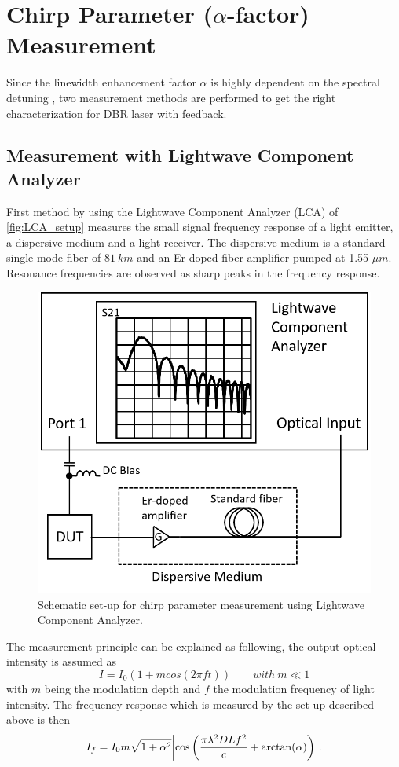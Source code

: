 \section{Chirp Parameter ($\alpha$-factor) Measurement}\label{sec:chirp_measurement}
Since the linewidth enhancement factor $\alpha$ is highly dependent on the spectral detuning \cite{soriano2013complex}, two measurement methods are performed to get the right characterization for DBR laser with feedback.

\subsection{Measurement with Lightwave Component Analyzer}\label{subsec:measurement_with_LCA}
First method by using the Lightwave Component Analyzer (LCA) of \autoref{fig:LCA_setup} measures the small signal frequency response of a light emitter, a dispersive medium and a light receiver. The dispersive medium is a standard single mode fiber of $81 \ km$ and an Er-doped fiber amplifier pumped at 1.55 $\mu m$. Resonance frequencies are observed as sharp peaks in the frequency response.
\begin{figure}[ht]
    \centering
    \includegraphics[width=.5\linewidth]{figures/LCA_setup.png}
    \caption{Schematic set-up for chirp parameter measurement using Lightwave Component Analyzer.}
    \label{fig:LCA_setup}
\end{figure}

The measurement principle can be explained as following, the output optical intensity is assumed as \cite{devaux1993simple}
\begin{equation}
    I=I_0(1+mcos(2\pi ft)) \qquad with \ m \ll 1
    \label{eq:chirp_optical_intensity}
\end{equation}
with $m$ being the modulation depth and $f$ the modulation frequency of light intensity. The frequency response which is measured by the set-up described above is then \cite{devaux1993simple}
\begin{equation}
    I_f=I_0m\sqrt{1+\alpha^2}\abs{\cos\qty(\frac{\pi\lambda^2DLf^2}{c}+\arctan(\alpha))}.
    \label{eq:chirp_optical_frequency}
\end{equation}

